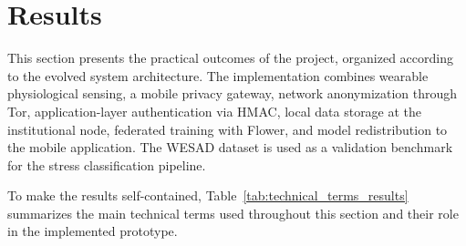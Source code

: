\documentclass[12pt]{article}
\begin{document}
\section{Results}

This section presents the practical outcomes of the project, organized according to the evolved system architecture. The implementation combines wearable physiological sensing, a mobile privacy gateway, network anonymization through Tor, application-layer authentication via HMAC, local data storage at the institutional node, federated training with Flower, and model redistribution to the mobile application. The WESAD dataset is used as a validation benchmark for the stress classification pipeline.

To make the results self-contained, Table~\ref{tab:technical_terms_results} summarizes the main technical terms used throughout this section and their role in the implemented prototype.

\begingroup
\small
\setlength{\tabcolsep}{4pt}
\renewcommand{\arraystretch}{1.08}
\end{document}
